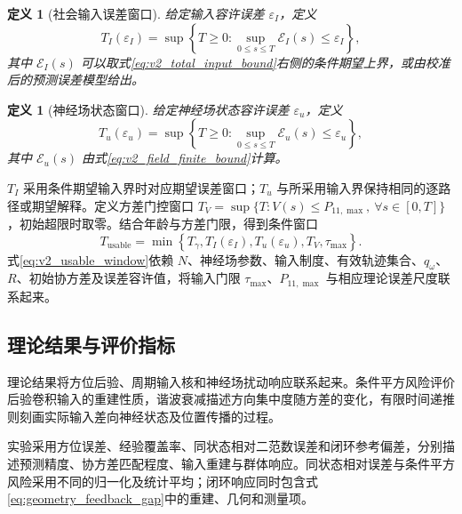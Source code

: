 \documentclass[UTF8,fontset=windows,11pt]{ctexart}
\newtheorem{definition}[theorem]{定义}
\begin{document}
\begin{definition}[社会输入误差窗口]
\label{def:v2_input_window}
给定输入容许误差 $\varepsilon_I$，定义
\begin{equation}
 T_I(\varepsilon_I)=\sup\left\{T\ge0:
 \sup_{0\le s\le T}\mathcal E_I(s)\le\varepsilon_I\right\},
 \label{eq:v2_input_window}
\end{equation}
其中 $\mathcal E_I(s)$ 可以取式\eqref{eq:v2_total_input_bound}右侧的条件期望上界，或由校准后的预测误差模型给出。
\end{definition}

\begin{definition}[神经场状态窗口]
\label{def:v2_field_window}
给定神经场状态容许误差 $\varepsilon_u$，定义
\begin{equation}
 T_u(\varepsilon_u)=\sup\left\{T\ge0:
 \sup_{0\le s\le T}\mathcal E_u(s)\le\varepsilon_u\right\},
 \label{eq:v2_field_window}
\end{equation}
其中 $\mathcal E_u(s)$ 由式\eqref{eq:v2_field_finite_bound}计算。
\end{definition}

$T_I$ 采用条件期望输入界时对应期望误差窗口；$T_u$ 与所采用输入界保持相同的逐路径或期望解释。定义方差门控窗口 $T_V=\sup\{T:V(s)\le P_{11,\max},\ \forall s\in[0,T]\}$，初始超限时取零。结合年龄与方差门限，得到条件窗口
\begin{equation}
 T_{\mathrm{usable}}
 =\min\left\{T_\gamma,
 T_I(\varepsilon_I),
 T_u(\varepsilon_u),T_V,
 \tau_{\max}\right\}.
 \label{eq:v2_usable_window}
\end{equation}
式\eqref{eq:v2_usable_window}依赖 $N$、神经场参数、输入制度、有效轨迹集合、$q_\omega$、$R$、初始协方差及误差容许值，将输入门限 $\tau_{\max}$、$P_{11,\max}$ 与相应理论误差尺度联系起来。

\subsection{理论结果与评价指标}

理论结果将方位后验、周期输入核和神经场扰动响应联系起来。条件平方风险评价后验卷积输入的重建性质，谐波衰减描述方向集中度随方差的变化，有限时间递推则刻画实际输入差向神经状态及位置传播的过程。

实验采用方位误差、经验覆盖率、同状态相对二范数误差和闭环参考偏差，分别描述预测精度、协方差匹配程度、输入重建与群体响应。同状态相对误差与条件平方风险采用不同的归一化及统计平均；闭环响应同时包含式\eqref{eq:geometry_feedback_gap}中的重建、几何和测量项。
\end{document}
